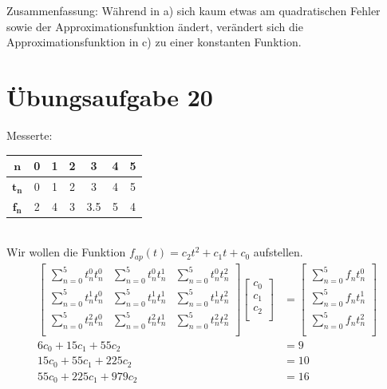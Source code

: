 	Zusammenfassung: \newline
	Während in a) sich kaum etwas am quadratischen Fehler sowie der Approximationsfunktion ändert, verändert sich die Approximationsfunktion in c) zu einer konstanten Funktion.

\newpage
    \section*{Übungsaufgabe 20}
    Messerte: \\
    \begin{tabular}{|c|c|c|c|c|c|c|}
        \hline
        $\mathbf{n}$   & 0 & 1 & 2 & 3   & 4 & 5 \\
        \hline
        $\mathbf{t_n}$ & 0 & 1 & 2 & 3   & 4 & 5 \\
        \hline
        $\mathbf{f_n}$ & 2 & 4 & 3 & 3.5 & 5 & 4 \\
        \hline
    \end{tabular} \\
    Wir wollen die Funktion $f_{ap}(t) = c_2 t^2 + c_1 t + c_0$ aufstellen.
    \begin{align*}
        \begin{bmatrix}
            \sum_{n=0}^{5} t_n^{0} t_n^{0} &
            \sum_{n=0}^{5} t_n^{0} t_n^{1} &
            \sum_{n=0}^{5} t_n^{0} t_n^{2} \\
            \sum_{n=0}^{5} t_n^{1} t_n^{0} &
            \sum_{n=0}^{5} t_n^{1} t_n^{1} &
            \sum_{n=0}^{5} t_n^{1} t_n^{2} \\
            \sum_{n=0}^{5} t_n^{2} t_n^{0} &
            \sum_{n=0}^{5} t_n^{2} t_n^{1} &
            \sum_{n=0}^{5} t_n^{2} t_n^{2} \\
        \end{bmatrix}
        \begin{bmatrix}
            c_{0} \\
            c_{1} \\
            c_{2} \\
        \end{bmatrix}
        &=
        \begin{bmatrix}
            \sum_{n=0}^{5} f_n t_n^{0}\\
            \sum_{n=0}^{5} f_n t_n^{1}\\
            \sum_{n=0}^{5} f_n t_n^{2}\\
        \end{bmatrix}
        \\
        6 c_{0} +
        15 c_{1} +
        55 c_{2} &=
        9\\
        15 c_{0} +
        55 c_{1} +
        225 c_{2} &=
        10\\
        55 c_{0} +
        225 c_{1} +
        979 c_{2} &=
        16\\
    \end{align*}
